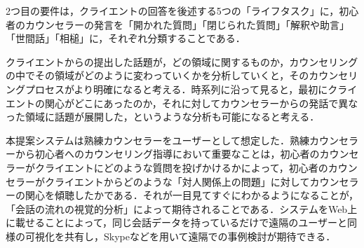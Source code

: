 \documentclass[shuuron]{kuee}
\begin{document}
2つ目の要件は，クライエントの回答を後述する5つの「ライフタスク」に，初心者のカウンセラーの発言を「開かれた質問」「閉じられた質問」「解釈や助言」「世間話」「相槌」に，それぞれ分類することである．%

クライエントからの提出した話題が，どの領域に関するものか，カウンセリングの中でその領域がどのように変わっていくかを分析していくと，そのカウンセリングプロセスがより明確になると考える．時系列に沿って見ると，最初にクライエントの関心がどこにあったのか，それに対してカウンセラーからの発話で異なった領域に話題が展開した，というような分析も可能になると考える．

本提案システムは熟練カウンセラーをユーザーとして想定した．熟練カウンセラーから初心者へのカウンセリング指導において重要なことは，初心者のカウンセラーがクライエントにどのような質問を投げかけるかによって，初心者のカウンセラーがクライエントからどのような「対人関係上の問題」に対してカウンセラーの関心を傾聴したかである．それが一目見てすぐにわかるようになることが，「会話の流れの視覚的分析」によって期待されることである．システムをWeb上に載せることによって，同じ会話データを持っているだけで遠隔のユーザーと同様の可視化を共有し，Skypeなどを用いて遠隔での事例検討が期待できる．




%




\end{document}
